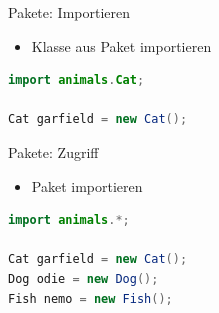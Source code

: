 \documentclass[18pt]{beamer}
\begin{document}
\begin{frame}[fragile]{Pakete: Importieren}
    \begin{itemize}
        \item Klasse aus Paket importieren
    \end{itemize}
    \begin{exampleblock}{}
        \begin{lstlisting}[language=Java]
import animals.Cat;

Cat garfield = new Cat();
        \end{lstlisting}
    \end{exampleblock}
\end{frame}

\begin{frame}[fragile]{Pakete: Zugriff}
    \begin{itemize}
        \item Paket importieren
    \end{itemize}
    \begin{exampleblock}{}
        \begin{lstlisting}[language=Java]
import animals.*;

Cat garfield = new Cat();
Dog odie = new Dog();
Fish nemo = new Fish();
        \end{lstlisting}
    \end{exampleblock}

\end{frame}
\end{document}
